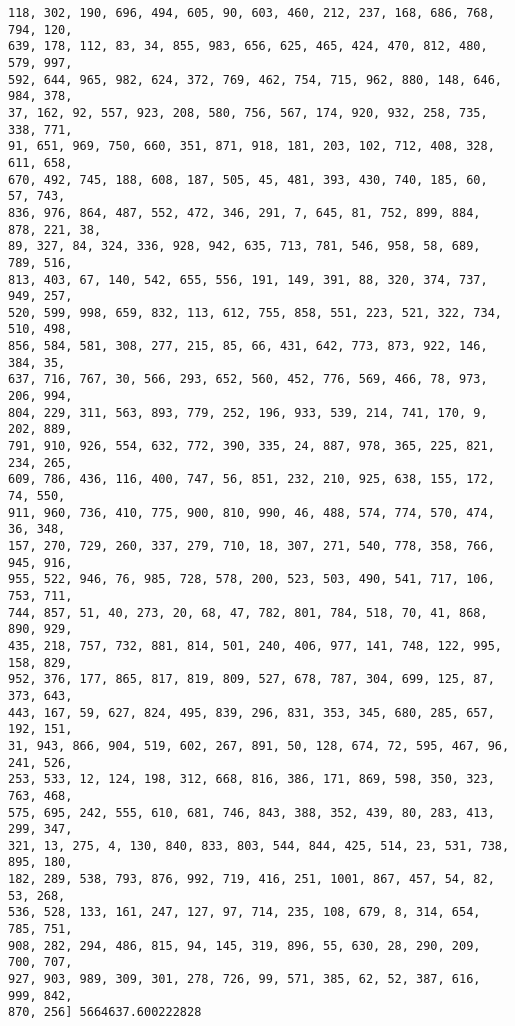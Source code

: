 \documentclass[11pt]{article}
\begin{document}
\begin{Verbatim}[commandchars=\\\{\}]
118, 302, 190, 696, 494, 605, 90, 603, 460, 212, 237, 168, 686, 768, 794, 120,
639, 178, 112, 83, 34, 855, 983, 656, 625, 465, 424, 470, 812, 480, 579, 997,
592, 644, 965, 982, 624, 372, 769, 462, 754, 715, 962, 880, 148, 646, 984, 378,
37, 162, 92, 557, 923, 208, 580, 756, 567, 174, 920, 932, 258, 735, 338, 771,
91, 651, 969, 750, 660, 351, 871, 918, 181, 203, 102, 712, 408, 328, 611, 658,
670, 492, 745, 188, 608, 187, 505, 45, 481, 393, 430, 740, 185, 60, 57, 743,
836, 976, 864, 487, 552, 472, 346, 291, 7, 645, 81, 752, 899, 884, 878, 221, 38,
89, 327, 84, 324, 336, 928, 942, 635, 713, 781, 546, 958, 58, 689, 789, 516,
813, 403, 67, 140, 542, 655, 556, 191, 149, 391, 88, 320, 374, 737, 949, 257,
520, 599, 998, 659, 832, 113, 612, 755, 858, 551, 223, 521, 322, 734, 510, 498,
856, 584, 581, 308, 277, 215, 85, 66, 431, 642, 773, 873, 922, 146, 384, 35,
637, 716, 767, 30, 566, 293, 652, 560, 452, 776, 569, 466, 78, 973, 206, 994,
804, 229, 311, 563, 893, 779, 252, 196, 933, 539, 214, 741, 170, 9, 202, 889,
791, 910, 926, 554, 632, 772, 390, 335, 24, 887, 978, 365, 225, 821, 234, 265,
609, 786, 436, 116, 400, 747, 56, 851, 232, 210, 925, 638, 155, 172, 74, 550,
911, 960, 736, 410, 775, 900, 810, 990, 46, 488, 574, 774, 570, 474, 36, 348,
157, 270, 729, 260, 337, 279, 710, 18, 307, 271, 540, 778, 358, 766, 945, 916,
955, 522, 946, 76, 985, 728, 578, 200, 523, 503, 490, 541, 717, 106, 753, 711,
744, 857, 51, 40, 273, 20, 68, 47, 782, 801, 784, 518, 70, 41, 868, 890, 929,
435, 218, 757, 732, 881, 814, 501, 240, 406, 977, 141, 748, 122, 995, 158, 829,
952, 376, 177, 865, 817, 819, 809, 527, 678, 787, 304, 699, 125, 87, 373, 643,
443, 167, 59, 627, 824, 495, 839, 296, 831, 353, 345, 680, 285, 657, 192, 151,
31, 943, 866, 904, 519, 602, 267, 891, 50, 128, 674, 72, 595, 467, 96, 241, 526,
253, 533, 12, 124, 198, 312, 668, 816, 386, 171, 869, 598, 350, 323, 763, 468,
575, 695, 242, 555, 610, 681, 746, 843, 388, 352, 439, 80, 283, 413, 299, 347,
321, 13, 275, 4, 130, 840, 833, 803, 544, 844, 425, 514, 23, 531, 738, 895, 180,
182, 289, 538, 793, 876, 992, 719, 416, 251, 1001, 867, 457, 54, 82, 53, 268,
536, 528, 133, 161, 247, 127, 97, 714, 235, 108, 679, 8, 314, 654, 785, 751,
908, 282, 294, 486, 815, 94, 145, 319, 896, 55, 630, 28, 290, 209, 700, 707,
927, 903, 989, 309, 301, 278, 726, 99, 571, 385, 62, 52, 387, 616, 999, 842,
870, 256] 5664637.600222828
    \end{Verbatim}

    \begin{center}
    \end{center}
    { \hspace*{\fill} \\}
    
\end{document}
